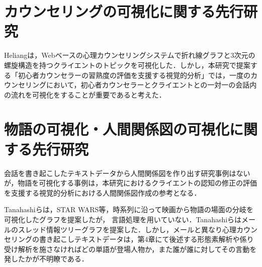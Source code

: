 \documentclass[shuuron]{kuee}
\begin{document}





\section{カウンセリングの可視化に関する先行研究}%

Heliang\cite{shou}は，Webベースの心理カウンセリングシステムで折れ線グラフと3次元の螺旋構造を持つクライエントのトピックを可視化した．しかし，本研究で提案する「初心者カウンセラーの習熟度の評価を支援する視覚的分析」では，一度のカウンセリングにおいて，初心者カウンセラーとクライエントとの一対一の会話内の流れを可視化をすることが重要であると考えた．

\section{物語の可視化・人間関係図の可視化に関する先行研究}%

会話を書き起こしたテキストデータから人間関係図を作り出す研究事例はないが，物語を可視化する事例は，本研究におけるクライエントの認知の修正の評価を支援する視覚的分析における人間関係図作成の参考となる．

Tanahashiら\cite{tanahashi2012design}は，STAR WARS等，時系列に沿って映画から物語の場面の分岐を可視化したグラフを提案したが，
言語処理を用いていない．Tanahashiら\cite{tanahashi2015efficient}はメールのスレッド情報ツリーグラフを提案した．しかし，メールと異なり心理カウンセリングの書き起こしテキストデータは，第4章にて後述する形態素解析や係り受け解析を施さなければどの単語が登場人物か，また誰が誰に対してその言動を発したかが不明瞭である．
\end{document}
